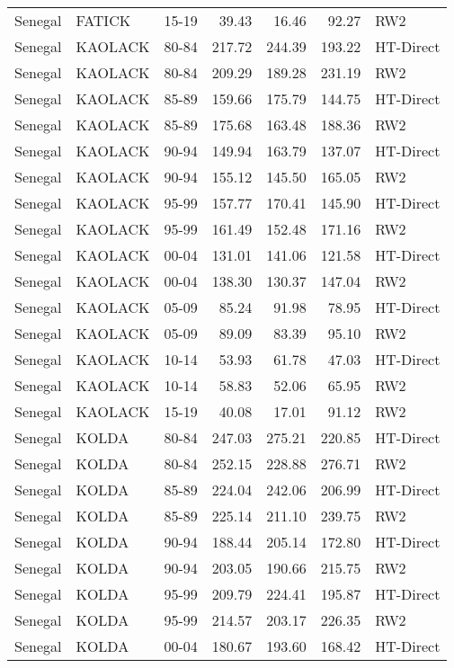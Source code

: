 \begin{longtable}{lllrrrl}
  Senegal & FATICK & 15-19 & 39.43 & 16.46 & 92.27 & RW2 \\ 
  Senegal & KAOLACK & 80-84 & 217.72 & 244.39 & 193.22 & HT-Direct \\ 
  Senegal & KAOLACK & 80-84 & 209.29 & 189.28 & 231.19 & RW2 \\ 
  Senegal & KAOLACK & 85-89 & 159.66 & 175.79 & 144.75 & HT-Direct \\ 
  Senegal & KAOLACK & 85-89 & 175.68 & 163.48 & 188.36 & RW2 \\ 
  Senegal & KAOLACK & 90-94 & 149.94 & 163.79 & 137.07 & HT-Direct \\ 
  Senegal & KAOLACK & 90-94 & 155.12 & 145.50 & 165.05 & RW2 \\ 
  Senegal & KAOLACK & 95-99 & 157.77 & 170.41 & 145.90 & HT-Direct \\ 
  Senegal & KAOLACK & 95-99 & 161.49 & 152.48 & 171.16 & RW2 \\ 
  Senegal & KAOLACK & 00-04 & 131.01 & 141.06 & 121.58 & HT-Direct \\ 
  Senegal & KAOLACK & 00-04 & 138.30 & 130.37 & 147.04 & RW2 \\ 
  Senegal & KAOLACK & 05-09 & 85.24 & 91.98 & 78.95 & HT-Direct \\ 
  Senegal & KAOLACK & 05-09 & 89.09 & 83.39 & 95.10 & RW2 \\ 
  Senegal & KAOLACK & 10-14 & 53.93 & 61.78 & 47.03 & HT-Direct \\ 
  Senegal & KAOLACK & 10-14 & 58.83 & 52.06 & 65.95 & RW2 \\ 
  Senegal & KAOLACK & 15-19 & 40.08 & 17.01 & 91.12 & RW2 \\ 
  Senegal & KOLDA & 80-84 & 247.03 & 275.21 & 220.85 & HT-Direct \\ 
  Senegal & KOLDA & 80-84 & 252.15 & 228.88 & 276.71 & RW2 \\ 
  Senegal & KOLDA & 85-89 & 224.04 & 242.06 & 206.99 & HT-Direct \\ 
  Senegal & KOLDA & 85-89 & 225.14 & 211.10 & 239.75 & RW2 \\ 
  Senegal & KOLDA & 90-94 & 188.44 & 205.14 & 172.80 & HT-Direct \\ 
  Senegal & KOLDA & 90-94 & 203.05 & 190.66 & 215.75 & RW2 \\ 
  Senegal & KOLDA & 95-99 & 209.79 & 224.41 & 195.87 & HT-Direct \\ 
  Senegal & KOLDA & 95-99 & 214.57 & 203.17 & 226.35 & RW2 \\ 
  Senegal & KOLDA & 00-04 & 180.67 & 193.60 & 168.42 & HT-Direct \\ 

\end{longtable}
